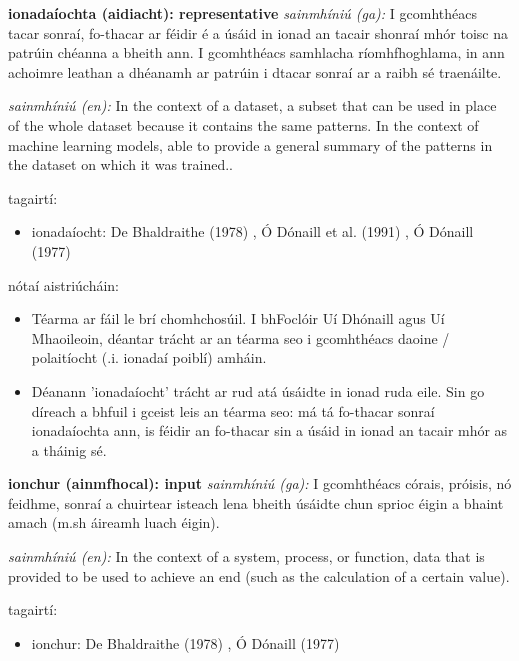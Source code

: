 \documentclass{article}
\begin{document}
\textbf{ionadaíochta (aidiacht): representative}
\textit{sainmhíniú (ga):} I gcomhthéacs tacar sonraí, fo-thacar ar féidir é a úsáid in ionad an tacair shonraí mhór toisc na patrúin chéanna a bheith ann. I gcomhthéacs samhlacha ríomhfhoghlama, in ann achoimre leathan a dhéanamh ar patrúin i dtacar sonraí ar a raibh sé traenáilte.

\textit{sainmhíniú (en):} In the context of a dataset, a subset that can be used in place of the whole dataset because it contains the same patterns. In the context of machine learning models, able to provide a general summary of the patterns in the dataset on which it was trained..

tagairtí:
\begin{itemize}
	\item ionadaíocht: De Bhaldraithe (1978) \cite{de-bhaldraithe}, Ó Dónaill et al. (1991) \cite{focloir-beag}, Ó Dónaill (1977) \cite{odonaill}
\end{itemize}

nótaí aistriúcháin:
\begin{itemize}
	\item Téarma ar fáil le brí chomhchosúil. I bhFoclóir Uí Dhónaill agus Uí Mhaoileoin, déantar trácht ar an téarma seo i gcomhthéacs daoine / polaitíocht (.i. ionadaí poiblí) amháin.
	\item Déanann 'ionadaíocht' trácht ar rud atá úsáidte in ionad ruda eile. Sin go díreach a bhfuil i gceist leis an téarma seo: má tá fo-thacar sonraí ionadaíochta ann, is féidir an fo-thacar sin a úsáid in ionad an tacair mhór as a tháinig sé.
\end{itemize}


\textbf{ionchur (ainmfhocal): input}
\textit{sainmhíniú (ga):} I gcomhthéacs córais, próisis, nó feidhme, sonraí a chuirtear isteach lena bheith úsáidte chun sprioc éigin a bhaint amach (m.sh áireamh luach éigin).

\textit{sainmhíniú (en):} In the context of a system, process, or function, data that is provided to be used to achieve an end (such as the calculation of a certain value).

tagairtí:
\begin{itemize}
	\item ionchur: De Bhaldraithe (1978) \cite{de-bhaldraithe}, Ó Dónaill (1977) \cite{odonaill}
\end{itemize}
\end{document}
